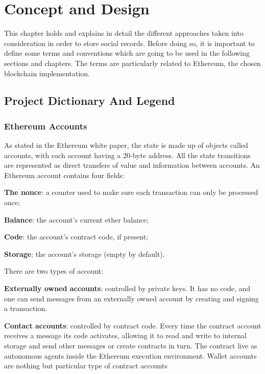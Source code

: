 \chapter{Concept and Design}
\label{chapter:concept}

This chapter holds and explains in detail the different approaches taken into consideration in order to store social records. Before doing so, it is important to define some terms and conventions which are going to be used in the following sections and chapters. The terms are particularly related to Ethereum, the chosen blockchain implementation. 

\section{Project Dictionary And Legend}

\subsection*{Ethereum Accounts}
As stated in the Ethereum white paper, the state is made up of objects called accounts, with each account having a 20-byte address. All the state transitions are represented as direct transfers of value and information between accounts. An Ethereum account contains four fields: 	
\begin{list}{}{}
\item \textbf{The nonce}: a counter used to make sure each transaction can only be processed once;
\item \textbf{Balance}: the account's current ether balance;
\item \textbf{Code}: the account's contract code, if present;
\item \textbf{Storage}: the account's storage (empty by default).
\end{list}
There are two types of account: 
\begin{list}{}{}
\item \textbf{Externally owned accounts}: controlled by private keys. It has no code, and one can send messages from an externally owned account by creating and signing a transaction. 
\item \textbf{Contact accounts}: controlled by contract code. Every time the contract account receives a message its code activates, allowing it to read and write to internal storage and send other messages or create contracts in turn. The contract live as autonomous agents inside the Ethereum execution environment. Wallet accounts are nothing but particular type of contract accounts \cite{EthereumWhitePaper}
\end{list}

